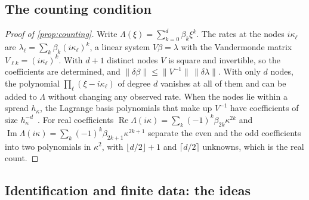 \documentclass[11pt]{article}
\theoremstyle{plain}
\theoremstyle{definition}
\theoremstyle{remark}
\newcommand{\norm}[1]{\lVert#1\rVert}
\begin{document}
\subsection{The counting condition}\label{sm:proof-counting}
\begin{proof}[Proof of \cref{prop:counting}]
Write $\Lambda(\xi)=\sum_{k=0}^d\beta_k\xi^k$. The rates at the nodes $i\kappa_\ell$ are
$\lambda_\ell=\sum_k\beta_k(i\kappa_\ell)^k$, a linear system $V\beta=\lambda$ with the Vandermonde matrix
$V_{\ell k}=(i\kappa_\ell)^k$. With $d+1$ distinct nodes $V$ is square and invertible, so the coefficients are determined, and
$\norm{\delta\beta}\le\norm{V^{-1}}\,\norm{\delta\lambda}$. With only $d$ nodes, the polynomial
$\prod_\ell(\xi-i\kappa_\ell)$ of degree $d$ vanishes at all of them and can be added to $\Lambda$ without changing any
observed rate. When the nodes lie within a spread $h_\kappa$, the Lagrange basis polynomials that make up $V^{-1}$ have
coefficients of size $h_\kappa^{-d}$~\cite{Gau62}. For real coefficients
$\operatorname{Re}\Lambda(i\kappa)=\sum_k(-1)^k\beta_{2k}\kappa^{2k}$ and
$\operatorname{Im}\Lambda(i\kappa)=\sum_k(-1)^k\beta_{2k+1}\kappa^{2k+1}$ separate the even and the odd coefficients into
two polynomials in $\kappa^2$, with $\lfloor d/2\rfloor+1$ and $\lceil d/2\rceil$ unknowns, which is the real count.
\end{proof}

\subsection{Identification and finite data: the ideas}\label{sm:ident}
\end{document}
